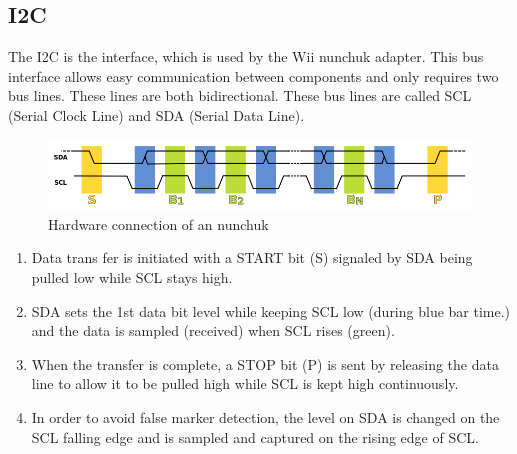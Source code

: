 \subsection{I2C}
The I2C is the interface, which is used by the Wii nunchuk adapter. This bus
interface allows easy communication between components and only requires two
bus lines. These lines are both bidirectional. These bus lines are called SCL
(Serial Clock Line) and SDA (Serial Data Line).


\begin{figure}[h]
\centering
\includegraphics[scale=0.4]{Figures/I2C}
\caption{Hardware connection of an nunchuk}
\label{fig:i2c}
\end{figure}


\begin{enumerate}
\item Data trans fer is initiated with a START bit (S) signaled by SDA being
pulled low while SCL stays high.
\item SDA sets the 1st data bit level while keeping SCL low (during blue bar
time.) and the data is sampled (received) when SCL rises (green).
\item When the transfer is complete, a STOP bit (P) is sent by releasing the
data line to allow it to be pulled high while SCL is kept high continuously.
\item In order to avoid false marker detection, the level on SDA is changed on
the SCL falling edge and is sampled and captured on the rising edge of SCL.
\end{enumerate}








